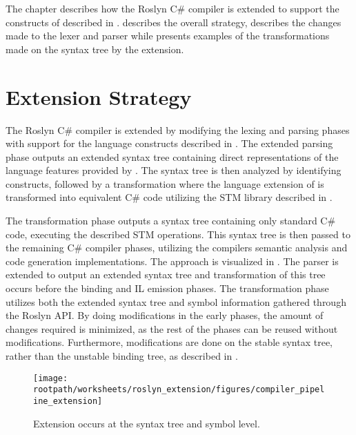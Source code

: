 \makeatletter {}\makeatother
{}
The chapter describes how the Roslyn C\# compiler is extended to support the constructs of \stmnamesp described in .  describes the overall strategy,  describes the changes made to the lexer and parser while  presents examples of the transformations made on the syntax tree by the extension.
\label{chap:roslyn_extension}
\section{Extension Strategy}
\label{sec:roslyn_extension_strategy}
The Roslyn C\# compiler is extended by modifying the lexing and parsing phases with support for the language constructs described in . The extended parsing phase outputs an extended syntax tree containing direct representations of the language features provided by \stmname. The syntax tree is then analyzed by identifying \stmnamesp constructs, followed by a transformation where the language extension of \stmnamesp is transformed into equivalent C\# code utilizing the \ac{STM} library described in . 

The transformation phase outputs a syntax tree containing only standard C\# code, executing the described \ac{STM} operations. This syntax tree is then passed to the remaining C\# compiler phases, utilizing the compilers semantic analysis and code generation implementations. The approach is visualized in . The parser is extended to output an extended syntax tree and transformation of this tree occurs before the binding and IL emission phases. The transformation phase utilizes both the extended syntax tree and symbol information gathered through the Roslyn \ac{API}. By doing modifications in the early phases, the amount of changes required is minimized, as the rest of the phases can be reused without modifications. Furthermore, modifications are done on the stable syntax tree, rather than the unstable binding tree, as described in .
\begin{figure}[htbp]
\centering
 \texttt{[image: \\rootpath/worksheets/roslyn\_extension/figures/compiler\_pipeline\_extension]} 
 \caption{Extension occurs at the syntax tree and symbol level.}
\label{fig:compiler_pipeline_extension}
\end{figure}

